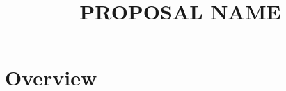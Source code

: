 \documentclass{article}
\begin{document}
\title{PROPOSAL NAME}

\maketitle

\section{Overview}

\begin{comment}
Google related material for research:
https://research.google.com/research-outreach.html#/research-outreach/faq/faculty-research-awards (What is the proper format for a Research Awards proposal PDF?)
https://research.google.com/researchers.html
https://research.google.com/pubs/DataMiningandModeling.html
https://research.google.com/research-outreach.html#/research-outreach/faq/latin-america-awards (How do I apply for the Google Research Awards for Latin America Program?)
https://research.google.com/research-outreach.html#/research-outreach/faq/proposal-advice

STXXL:
http://stxxl.sourceforge.net/
http://stxxl.sourceforge.net/tags/master/

Stack overflow (TPIE STXXL):
http://stackoverflow.com/search?tab=relevance&q=tpie%
http://stackoverflow.com/search?q=tpie (tpie returns 14 results on 24/05/2016, not all related to tpie)
http://stackoverflow.com/search?q=stxxl (stxxl returns 187 results on 24/05/2016)

Long time abandoned EM library:
http://www.ziegelmann.org/ziegelmann/Mark%

TPIE:
http://madalgo.au.dk/tpie/
https://github.com/thomasmoelhave/tpie
http://www.madalgo.au.dk/tpie/doc/v1.1/basicconcepts.html#basicconcepts

\end{comment}
\end{document}
